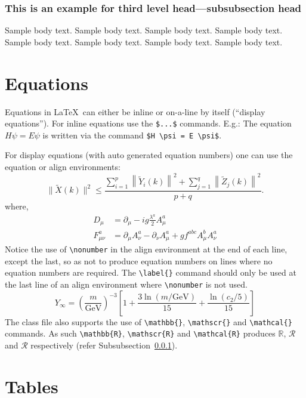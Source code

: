 \documentclass[lineno,pdflatex,sn-nature]{sn-jnl}%
\begin{document}
\subsubsection{This is an example for third level head---subsubsection head}\label{subsubsec2}

Sample body text. Sample body text. Sample body text. Sample body text. Sample body text. Sample body text. Sample body text. Sample body text. 

\section{Equations}\label{sec4}

Equations in \LaTeX\ can either be inline or on-a-line by itself (``display equations''). For
inline equations use the \verb+$...$+ commands. E.g.: The equation
$H\psi = E \psi$ is written via the command \verb+$H \psi = E \psi$+.

For display equations (with auto generated equation numbers)
one can use the equation or align environments:
\begin{equation}
\|\tilde{X}(k)\|^2 \leq\frac{\sum\limits_{i=1}^{p}\left\|\tilde{Y}_i(k)\right\|^2+\sum\limits_{j=1}^{q}\left\|\tilde{Z}_j(k)\right\|^2 }{p+q}.\label{eq1}
\end{equation}
where,
\begin{align}
D_\mu &=  \partial_\mu - ig \frac{\lambda^a}{2} A^a_\mu \nonumber \\
F^a_{\mu\nu} &= \partial_\mu A^a_\nu - \partial_\nu A^a_\mu + g f^{abc} A^b_\mu A^a_\nu \label{eq2}
\end{align}
Notice the use of \verb+\nonumber+ in the align environment at the end
of each line, except the last, so as not to produce equation numbers on
lines where no equation numbers are required. The \verb+\label{}+ command
should only be used at the last line of an align environment where
\verb+\nonumber+ is not used.
\begin{equation}
Y_\infty = \left( \frac{m}{\textrm{GeV}} \right)^{-3}
    \left[ 1 + \frac{3 \ln(m/\textrm{GeV})}{15}
    + \frac{\ln(c_2/5)}{15} \right]
\end{equation}
The class file also supports the use of \verb+\mathbb{}+, \verb+\mathscr{}+ and
\verb+\mathcal{}+ commands. As such \verb+\mathbb{R}+, \verb+\mathscr{R}+
and \verb+\mathcal{R}+ produces $\mathbb{R}$, $\mathscr{R}$ and $\mathcal{R}$
respectively (refer Subsubsection~\ref{subsubsec2}).

\section{Tables}\label{sec5}
\end{document}
